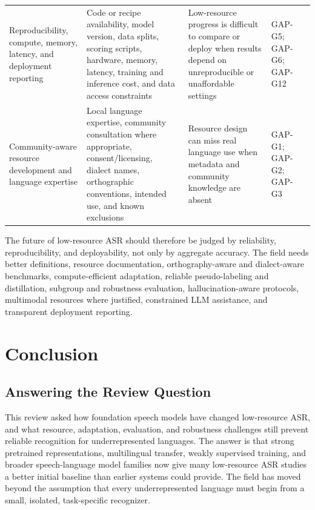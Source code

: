 \documentclass[pdflatex,sn-basic,iicol]{sn-jnl}
\theoremstyle{thmstyleone}
\theoremstyle{thmstyletwo}
\theoremstyle{thmstylethree}
\begin{document}
\begin{table}[htbp]
\begin{tabularx}{\textwidth}{YYYYY}
Reproducibility, compute, memory, latency, and deployment reporting & Code or recipe availability, model version, data splits, scoring scripts, hardware, memory, latency, training and inference cost, and data access constraints & Low-resource progress is difficult to compare or deploy when results depend on unreproducible or unaffordable settings & GAP-G5; GAP-G6; GAP-G12 & \citep{watanabe2018espnet,ravanelli2021speechbrain,povey2011kaldi,strubell2019_energy_policy} \\
Community-aware resource development and language expertise & Local language expertise, community consultation where appropriate, consent/licensing, dialect names, orthographic conventions, intended use, and known exclusions & Resource design can miss real language use when metadata and community knowledge are absent & GAP-G1; GAP-G2; GAP-G3 & \citep{ardila2020commonvoice,bender2018_data_statements,gebru2021_datasheets_for_datasets,mitchell2019_model_cards} \\
\bottomrule
\end{tabularx}
\end{table}

The future of low-resource ASR should therefore be judged by reliability, reproducibility, and deployability, not only by aggregate accuracy. The field needs better definitions, resource documentation, orthography-aware and dialect-aware benchmarks, compute-efficient adaptation, reliable pseudo-labeling and distillation, subgroup and robustness evaluation, hallucination-aware protocols, multimodal resources where justified, constrained LLM assistance, and transparent deployment reporting.

\section{Conclusion}

\subsection{Answering the Review Question}

This review asked how foundation speech models have changed low-resource ASR, and what resource, adaptation, evaluation, and robustness challenges still prevent reliable recognition for underrepresented languages. The answer is that strong pretrained representations, multilingual transfer, weakly supervised training, and broader speech-language model families now give many low-resource ASR studies a better initial baseline than earlier systems could provide. The field has moved beyond the assumption that every underrepresented language must begin from a small, isolated, task-specific recognizer.
\end{document}
